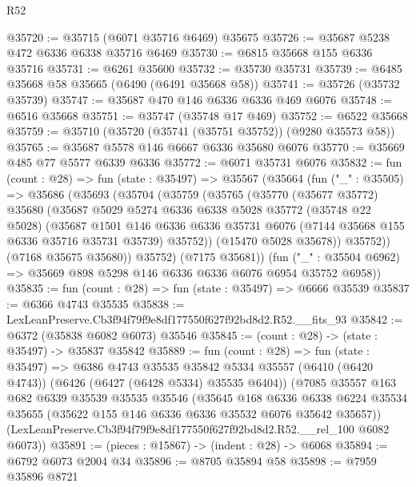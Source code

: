 \begin{lexlean}{R52}
\begin{coremodule}
@35720 := @35715 (@6071 @35716 @6469) @35675
@35726 := @35687 @5238 @472 @6336 @6338 @35716 @6469
@35730 := @6815 @35668 @155 @6336 @35716
@35731 := @6261 @35600
@35732 := @35730 @35731
@35739 := @6485 @35668 @58 @35665 (@6490 (@6491 @35668 @58))
@35741 := @35726 (@35732 @35739)
@35747 := @35687 @470 @146 @6336 @6336 @469 @6076
@35748 := @6516 @35668
@35751 := @35747 (@35748 @17 @469)
@35752 := @6522 @35668
@35759 := @35710 (@35720 (@35741 (@35751 @35752)) (@9280 @35573 @58))
@35765 := @35687 @5578 @146 @6667 @6336 @35680 @6076
@35770 := @35669 @485 @77 @5577 @6339 @6336
@35772 := @6071 @35731 @6076
@35832 := fun (count : @28) =>
  fun (state : @35497) =>
  @35567
    (@35664
      (fun ("_" : @35505) =>
      @35686
        (@35693
          (@35704
            (@35759
              (@35765
                (@35770
                  (@35677 @35772)
                  @35680
                  (@35687
                    @5029
                    @5274
                    @6336
                    @6338
                    @5028
                    @35772
                    (@35748 @22 @5028)
                    (@35687
                      @1501
                      @146
                      @6336
                      @6336
                      @35731
                      @6076
                      (@7144 @35668 @155 @6336 @35716 @35731 @35739)
                      @35752))
                  (@15470 @5028 @35678))
                @35752))
            (@7168 @35675 @35680))
          @35752)
        (@7175 @35681))
      (fun ("_" : @35504 @6962) => @35669 @898 @5298 @146 @6336 @6336 @6076 @6954 @35752 @6958))
@35835 := fun (count : @28) => fun (state : @35497) => @6666 @35539
@35837 := @6366 @4743 @35535
@35838 := LexLeanPreserve.Cb3f94f79f9e8df177550f627f92bd8d2.R52.__fits_93
@35842 := @6372 (@35838 @6082 @6073) @35546
@35845 := (count : @28) -> (state : @35497) -> @35837 @35842
@35889 := fun (count : @28) =>
  fun (state : @35497) =>
  @6386
    @4743
    @35535
    @35842
    @5334
    @35557
    (@6410 (@6420 @4743))
    (@6426 (@6427 (@6428 @5334) @35535 @6404))
    (@7085
      @35557
      @163
      @682
      @6339
      @35539
      @35535
      @35546
      (@35645
        @168
        @6336
        @6338
        @6224
        @35534
        @35655
        (@35622 @155 @146 @6336 @6336 @35532 @6076 @35642 @35657))
      (LexLeanPreserve.Cb3f94f79f9e8df177550f627f92bd8d2.R52.__rel_100 @6082 @6073))
@35891 := (pieces : @15867) -> (indent : @28) -> @6068
@35894 := @6792 @6073 @2004 @34
@35896 := @8705 @35894 @58
@35898 := @7959 @35896 @8721

\end{coremodule}
\end{lexlean}
